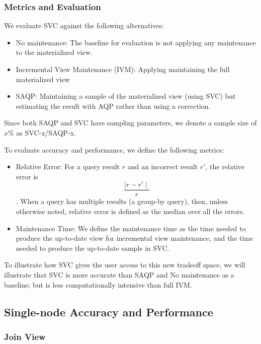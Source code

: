 \subsubsection{Metrics and Evaluation}
We evaluate SVC against the following alternatives:
\begin{itemize}
\item No maintenance: The baseline for evaluation is not applying any maintenance to the materialized view.
\item Incremental View Maintenance (IVM): Applying maintaining the full materialized view
\item SAQP: Maintaining a sample of the materialized view (using SVC) but estimating the result with AQP rather than using 
a correction.
\end{itemize}
Since both SAQP and SVC have sampling parameters, we denote a sample size of $x \% $ as SVC-x/SAQP-x.

To evaluate accuracy and performance, we define the following metrics:
\begin{itemize}
\item Relative Error: For a query result $r$ and an incorrect result $r'$, the relative error is \[\frac{\mid r-r' \mid}{r}\]. 
When a query has multiple results (a group-by query), then, unless otherwise noted, relative error is defined as the median over all the errors.
\item Maintenance Time: We define the maintenance time as the time needed to produce the up-to-date view for incremental view maintenance, and the time needed to produce the up-to-date sample in SVC. 
\end{itemize}

To illustrate how SVC gives the user access to this new tradeoff space, we will illustrate that SVC is more accurate than SAQP and No maintenance as a baseline; but is less computationally intensive than full IVM. 

\subsection{Single-node Accuracy and Performance}

\subsubsection{Join View}

